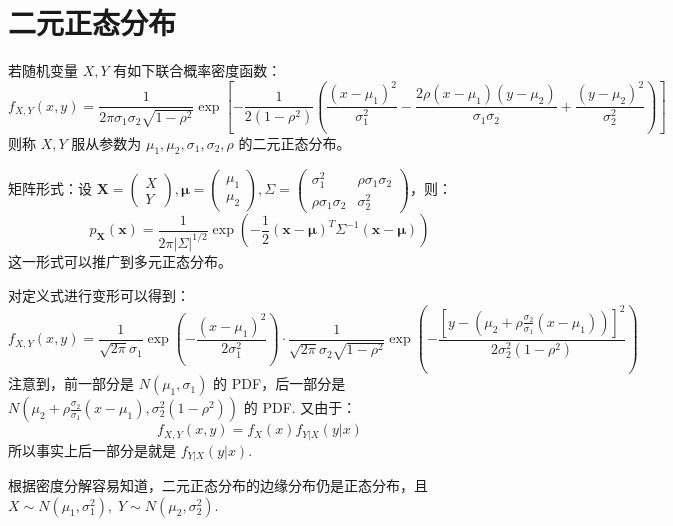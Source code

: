 \section{二元正态分布}
\label{sec:two-normal}

\begin{definition}[二元正态分布]
若随机变量 $X,Y$ 有如下联合概率密度函数：
\[
f_{X,Y}(x,y)=\frac{1}{2\pi\sigma_1\sigma_2\sqrt{1-\rho^2}}\exp\left[-\frac{1}{2(1-\rho^2)}\left(\frac{(x-\mu_1)^2}{\sigma_1^2}-\frac{2\rho(x-\mu_1)(y-\mu_2)}{\sigma_1\sigma_2}+\frac{(y-\mu_2)^2}{\sigma_2^2}\right)\right]
\]
则称 $X,Y$ 服从参数为 $\mu_1,\mu_2,\sigma_1,\sigma_2,\rho$ 的二元正态分布。
\end{definition}

\begin{com}
矩阵形式：设 $\mathbf X=\begin{pmatrix}X\\Y\end{pmatrix},\boldsymbol\mu=\begin{pmatrix}\mu_1\\\mu_2\end{pmatrix},\Sigma=\begin{pmatrix}\sigma_1^2&\rho\sigma_1\sigma_2\\\rho\sigma_1\sigma_2&\sigma_2^2\end{pmatrix}$，则：
\[
p_{\mathbf X}(\mathbf x)=\frac{1}{2\pi{|\Sigma|}^{1/2}}\exp\left(-\frac{1}{2}(\mathbf x-\boldsymbol\mu)^T\Sigma^{-1}(\mathbf x-\boldsymbol\mu)\right)
\]
这一形式可以推广到多元正态分布。
\end{com}

\begin{theorem}[二元正态分布的密度分解]
对定义式进行变形可以得到：
\[
f_{X,Y}(x,y)=\frac{1}{\sqrt{2\pi}\sigma_1}\exp\left(-\frac{(x-\mu_1)^2}{2\sigma_1^2}\right)\cdot\frac{1}{\sqrt{2\pi}\sigma_2\sqrt{1-\rho^2}}\exp\left(-\frac{\left[y-\left(\mu_2+\rho\frac{\sigma_2}{\sigma_1}(x-\mu_1)\right)\right]^2}{2\sigma_2^2(1-\rho^2)}\right)
\]
注意到，前一部分是 $N(\mu_1,\sigma_1)$ 的 PDF，后一部分是 $N\left(\mu_2+\rho\frac{\sigma_2}{\sigma_1}(x-\mu_1),\sigma_2^2(1-\rho^2)\right)$ 的 PDF. 又由于：
\[
f_{X,Y}(x,y)=f_X(x)f_{Y|X}(y|x)
\]
所以事实上后一部分是就是 $f_{Y|X}(y|x)$. 
\end{theorem}

\begin{theorem}[二元正态分布的边缘分布]
根据密度分解容易知道，二元正态分布的边缘分布仍是正态分布，且 $X\sim N(\mu_1,\sigma_1^2),\; Y\sim N(\mu_2,\sigma_2^2)$.
\end{theorem}

